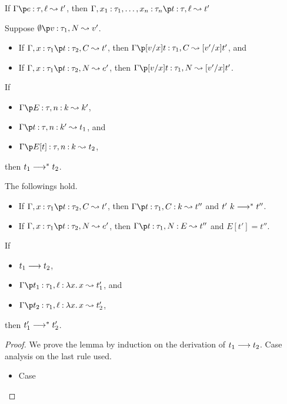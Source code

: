 \begin{lemma}
\label{lem:cps_weak}
If $\CPS{\Gamma}{e}{\tau}{\ell}{t'}$, then $\CPS{\Gamma,x_1\COL\tau_1,\dots,x_n\COL\tau_n}{t}{\tau}{\ell}{t'}$
\end{lemma}


\begin{lemma}
\label{lem:cps_sub}
Suppose $\CPS{\emptyset}{v}{\tau_1}{\NC}{v'}$.
\begin{itemize}
\item If $\CPS{\Gamma, x \COL \tau_1}{t}{\tau_2}{\IC}{t'}$,
      then $\CPS{\Gamma}{[v/x]t}{\tau_1}{\IC}{[v'/x]t'}$, and
\item If $\CPS{\Gamma, x \COL \tau_1}{t}{\tau_2}{\NC}{e'}$,
      then $\CPS{\Gamma}{[v/x]t}{\tau_1}{\NC}{[v'/x]t'}$.
\end{itemize}
\end{lemma}


\begin{lemma}
\label{lem:colon_context}
If
\begin{itemize}
\item $\CPScolon{\Gamma}{E}{\tau}{n}{k}{k'}$,
\item $\CPScolon{\Gamma}{t}{\tau}{n}{k'}{t_1}$, and
\item $\CPScolon{\Gamma}{E[t]}{\tau}{n}{k}{t_2}$,
\end{itemize}
then $t_1 \longrightarrow^* t_2$.
\end{lemma}


\begin{lemma}
\label{lem:init_red}
The followings hold.
\begin{itemize}
\item If $\CPS{\Gamma, x \COL \tau_1}{t}{\tau_2}{\IC}{t'}$,
      then $\CPScolon{\Gamma}{t}{\tau_1}{\IC}{k}{t''}$ and ${t'}~{k} \longrightarrow^* t''$.
\item If $\CPS{\Gamma, x \COL \tau_1}{t}{\tau_2}{\NC}{e'}$,
      then $\CPScolon{\Gamma}{t}{\tau_1}{\NC}{E}{t''}$ and $E[t'] = t''$.
\end{itemize}
\end{lemma}


\begin{lemma}
\label{lem:cps_sim}
If
\begin{itemize}
\item $t_1 \longrightarrow t_2$,
\item $\CPScolon{\Gamma}{t_1}{\tau_1}{\ell}{\Abs{x}{x}}{t_1'}$, and
\item $\CPScolon{\Gamma}{t_2}{\tau_1}{\ell}{\Abs{x}{x}}{t_2'}$,
\end{itemize}
then $t_1' \longrightarrow^* t_2'$.
\end{lemma}
\begin{proof}
We prove the lemma by induction on the derivation of $t_1 \longrightarrow t_2$.
Case analysis on the last rule used.
\begin{itemize}
\item Case
\end{itemize}
\end{proof}

